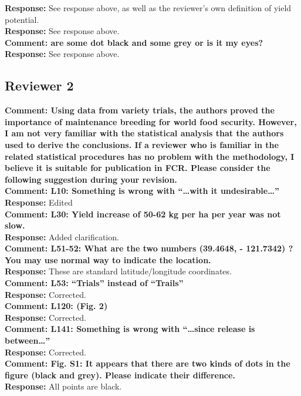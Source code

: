 \documentclass{article} \usepackage[margin=1in]{geometry}
\begin{document}
\textbf{Response: } See response above, as well as the reviewer's own
definition of yield potential.\\

\textbf{Response: } See response above.\\

\textbf{Comment: are some dot black and some grey or is it my eyes?}\\

\textbf{Response: } See response above.\\

\subsection{Reviewer 2}

\textbf{Comment: Using data from variety trials, the authors proved the importance of
  maintenance breeding for world food security. However, I am not very
  familiar with the statistical analysis that the authors used to derive
  the conclusions. If a reviewer who is familiar in the related
  statistical procedures has no problem with the methodology, I believe
  it is suitable for publication in FCR. Please consider the following
  suggestion during your revision.}\\


\textbf{Comment: L10: Something is wrong with “…with it undesirable…”}\\

\textbf{Response:} Edited\\

\textbf{Comment: L30: Yield increase of 50-62 kg per ha per year was not slow.}\\

\textbf{Response:} Added clarification.\\

\textbf{Comment: L51-52: What are the two numbers (39.4648, - 121.7342) ? You may use
normal way to indicate the location.}\\

\textbf{Response:} These are standard latitude/longitude coordinates.\\

\textbf{Comment: L53: “Trials” instead of “Trails”}\\

\textbf{Response:} Corrected.\\

\textbf{Comment: L120: (Fig. 2)}\\

\textbf{Response:} Corrected.\\

\textbf{Comment: L141: Something is wrong with “…since release is between…”}\\

\textbf{Response:} Corrected.\\

\textbf{Comment: Fig. S1: It appears that there are two kinds of dots in the figure
(black and grey). Please indicate their difference.}\\

\textbf{Response:} All points are black.\\
\end{document}
